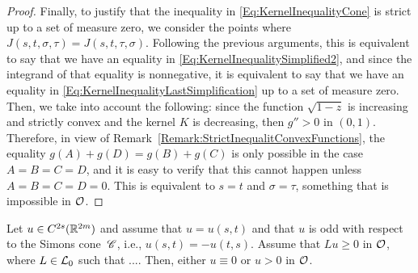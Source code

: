 \begin{proof}
Finally, to justify that the inequality in \eqref{Eq:KernelInequalityCone} is strict up to a set of
measure zero, we consider the points where $J(s,t,\sigma, \tau) = J(s,t,\tau,\sigma)$. Following
the previous arguments, this is equivalent to say that we have an equality in
\eqref{Eq:KernelInequalitySimplified2}, and since the integrand of that equality is nonnegative, it
is equivalent to say that we have an equality in \eqref{Eq:KernelInequalityLastSimplification} up
to a set of measure zero. Then, we take into account the following: since the function $\sqrt{1-z}$
is increasing and strictly convex and the kernel $K$ is decreasing, then $g''>0$ in $(0,1)$.
Therefore, in view of Remark~\eqref{Remark:StrictInequalitConvexFunctions}, the equality $g(A) +
g(D) = g(B) + g(C)$ is only possible in the case $A=B=C=D$, and it is easy to verify that this
cannot happen unless $A=B=C=D=0$. This is equivalent to $s=t$ and $\sigma=\tau$,
something that is impossible in $\mathcal{O}$.

\end{proof}


\begin{proposition}
\label{Prop:StrongMaximumPrincipleForOddFunctions} Let $u\in C^{2s}(\mathbb{R}^{2m})$  and assume that $u = u(s,t)$ and that $u$ is odd with respect to the Simons cone~$\mathscr{C}$,
i.e., $u(s,t) = - u(t,s)$. Assume that $Lu \geq 0$ in $\mathcal{O}$, where $L \in \mathcal{L}_0$ such that
.... Then, either $u\equiv 0$ or $u > 0$ in
$\mathcal{O}$.
\end{proposition}

